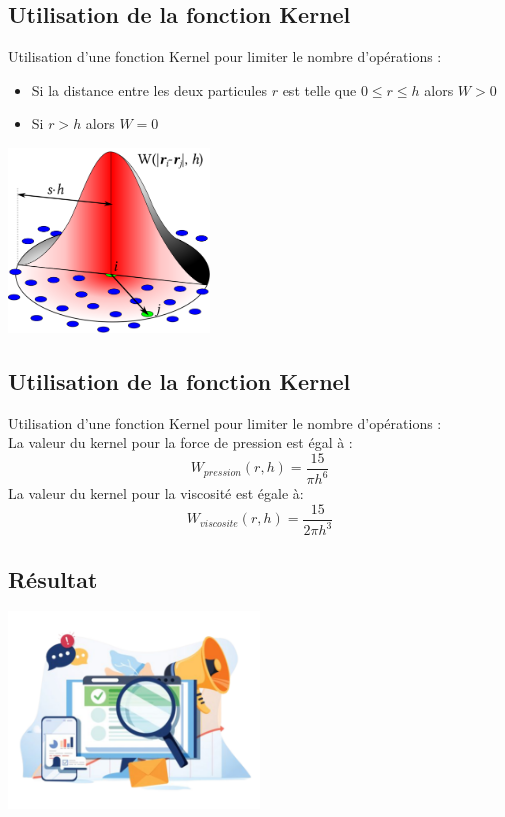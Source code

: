 \documentclass{article}
\begin{document}
\newpage
\vspace*{2pt}
\thispagestyle{landscape}
\subsection{Utilisation de la fonction Kernel}
Utilisation d’une fonction Kernel pour limiter le nombre d’opérations : 

\begin{itemize}
    \item Si la distance entre les deux particules $r$ est telle que $0 \leq r \leq h$ alors $W > 0$
    \item Si $r > h$ alors $W = 0$
\end{itemize}
\begin{center}
    \includegraphics[width=0.4\textwidth]{fonction_kernel.png}
\end{center}

\newpage
\vspace*{2pt}
\thispagestyle{landscape}
\subsection{Utilisation de la fonction Kernel}
Utilisation d’une fonction Kernel pour limiter le nombre d’opérations :\\
La valeur du kernel pour la  force de pression est égal à :\\
$$W_{pression}(r,h)= \frac{15}{\pi h^6}$$ 
La valeur du kernel pour la viscosité est égale à:
$$W_{viscosite}(r,h)= \frac{15}{2\pi h^3}$$

\newpage
\vspace*{2pt}
\thispagestyle{landscape}
\begin{center}
    \section{Résultat}
    \includegraphics[width=0.5\textwidth]{result.png}
\end{center}
\end{document}
